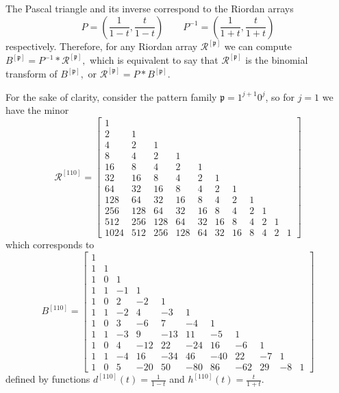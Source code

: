 The Pascal triangle and its inverse correspond to the Riordan arrays $$P
=\left(\frac{1}{1-t},\frac{t}{1-t}\right) \quad\quad
P^{-1}=\left(\frac{1}{1+t},\frac{t}{1+t}\right)$$ respectively.  Therefore, for
any Riordan array $\mathcal{R}^{[\mathfrak{p}]}$ we can compute
$B^{[\mathfrak{p}]}= P^{-1} \ast \mathcal{R}^{[\mathfrak{p}]},$ which is
equivalent to say that  $\mathcal{R}^{[\mathfrak{p}]}$ is the binomial
transform of $B^{[\mathfrak{p}]},$ or $\mathcal{R}^{[\mathfrak{p}]}=P \ast
B^{[\mathfrak{p}]}$.

For the sake of clarity, consider the pattern family $\mathfrak{p}=1^{j+1}0^{j}$,
so for $j=1$ we have the minor
\begin{displaymath}
\mathcal{R}^{[110]} = \left[\begin{array}{ccccccccccc}1 &  &  &  &  &  &  &  &  &  & \\2 & 1 &  &  &  &  &  &  &  &  & \\4 & 2 & 1 &  &  &  &  &  &  &  & \\8 & 4 & 2 & 1 &  &  &  &  &  &  & \\16 & 8 & 4 & 2 & 1 &  &  &  &  &  & \\32 & 16 & 8 & 4 & 2 & 1 &  &  &  &  & \\64 & 32 & 16 & 8 & 4 & 2 & 1 &  &  &  & \\128 & 64 & 32 & 16 & 8 & 4 & 2 & 1 &  &  & \\256 & 128 & 64 & 32 & 16 & 8 & 4 & 2 & 1 &  & \\512 & 256 & 128 & 64 & 32 & 16 & 8 & 4 & 2 & 1 & \\1024 & 512 & 256 & 128 & 64 & 32 & 16 & 8 & 4 & 2 & 1\end{array}\right]
\end{displaymath}
which corresponds to
\begin{displaymath}
B^{[110]} = \left[\begin{array}{ccccccccccc}
1 &  &  &  &  &  &  &  &  &  & \\
1 & 1 &  &  &  &  &  &  &  &  & \\
1 & 0 & 1 &  &  &  &  &  &  &  & \\
1 & 1 & -1 & 1 &  &  &  &  &  &  & \\
1 & 0 & 2 & -2 & 1 &  &  &  &  &  & \\
1 & 1 & -2 & 4 & -3 & 1 &  &  &  &  & \\
1 & 0 & 3 & -6 & 7 & -4 & 1 &  &  &  & \\
1 & 1 & -3 & 9 & -13 & 11 & -5 & 1 &  &  & \\
1 & 0 & 4 & -12 & 22 & -24 & 16 & -6 & 1 &  & \\
1 & 1 & -4 & 16 & -34 & 46 & -40 & 22 & -7 & 1 & \\
1 & 0 & 5 & -20 & 50 & -80 & 86 & -62 & 29 & -8 & 1\end{array}\right]
\end{displaymath}
defined by functions 
$ d^{[110]}(t)=\frac{1}{1-t}$ and
$h^{[110]}(t)=\frac{t}{1+t}$.

